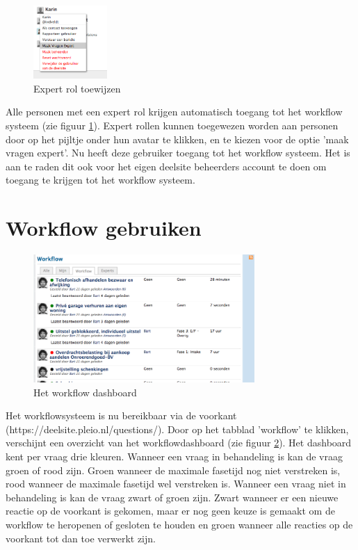 \documentclass[12pt]{article}
\begin{document}
\begin{figure}
  \centering
  \includegraphics[width=0.25\textwidth]{img/add-expert.png}
  \caption{Expert rol toewijzen}
  \label{fig:expert}
\end{figure}

Alle personen met een expert rol krijgen automatisch toegang tot het workflow systeem (zie figuur \ref{fig:expert}). Expert rollen kunnen toegewezen worden aan personen door op het pijltje onder hun avatar te klikken, en te kiezen voor de optie 'maak vragen expert'. Nu heeft deze gebruiker toegang tot het workflow systeem. Het is aan te raden dit ook voor het eigen deelsite beheerders account te doen om toegang te krijgen tot het workflow systeem.

\section{Workflow gebruiken}

\begin{figure}
  \centering
  \includegraphics[width=0.75\textwidth]{img/workflow-overview.png}
  \caption{Het workflow dashboard}
  \label{fig:dashboard}
\end{figure}

Het workflowsysteem is nu bereikbaar via de voorkant (https://deelsite.pleio.nl/questions/). Door op het tabblad 'workflow' te klikken, verschijnt een overzicht van het workflowdashboard (zie figuur \ref{fig:dashboard}). Het dashboard kent per vraag drie kleuren. Wanneer een vraag in behandeling is kan de vraag groen of rood zijn. Groen wanneer de maximale fasetijd nog niet verstreken is, rood wanneer de maximale fasetijd wel verstreken is. Wanneer een vraag niet in behandeling is kan de vraag zwart of groen zijn. Zwart wanneer er een nieuwe reactie op de voorkant is gekomen, maar er nog geen keuze is gemaakt om de workflow te heropenen of gesloten te houden en groen wanneer alle reacties op de voorkant tot dan toe verwerkt zijn.
\end{document}
